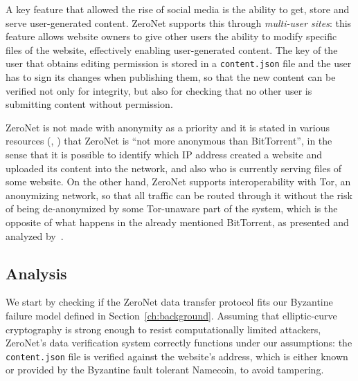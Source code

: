 \documentclass[mscthesis]{usiinfthesis}
\begin{document}
A key feature that allowed the rise of social media is the ability to get, store and serve user-generated content. ZeroNet supports this through \emph{multi-user sites}: this feature allows website owners to give other users the ability to modify specific files of the website, effectively enabling user-generated content. The key of the user that obtains editing permission is stored in a \texttt{content.json} file and the user has to sign its changes when publishing them, so that the new content can be verified not only for integrity, but also for checking that no other user is submitting content without permission.

ZeroNet is not made with anonymity as a priority and it is stated in various resources (\cite{website:zeronetpresentation}, \cite{website:zeronetfaq}) that ZeroNet is ``not more anonymous than BitTorrent'', in the sense that it is possible to identify which IP address created a website and uploaded its content into the network, and also who is currently serving files of some website. On the other hand, ZeroNet supports interoperability with Tor, an anonymizing network, so that all traffic can be routed through it without the risk of being de-anonymized by some Tor-unaware part of the system, which is the opposite of what happens in the already mentioned BitTorrent, as presented and analyzed by~\cite{manils2010compromising}.

\subsection{Analysis}

We start by checking if the ZeroNet data transfer protocol fits our Byzantine failure model defined in Section~\ref{ch:background}. Assuming that elliptic-curve cryptography is strong enough to resist computationally limited attackers, ZeroNet's data verification system correctly functions under our assumptions: the \texttt{content.json} file is verified against the website's address, which is either known or provided by the Byzantine fault tolerant Namecoin, to avoid tampering.
\end{document}
